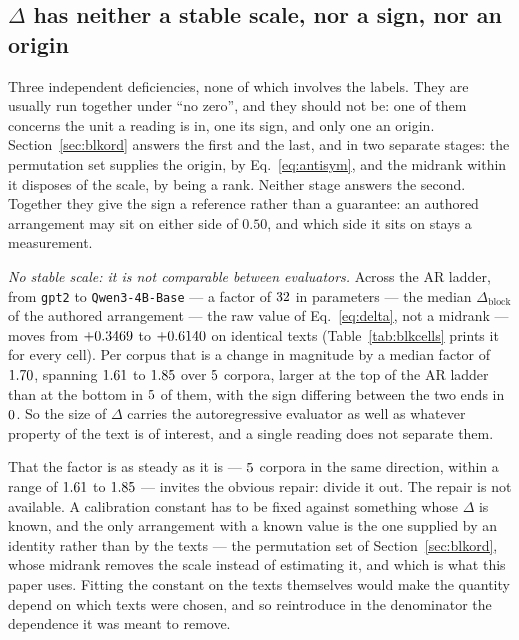 \documentclass[11pt]{article}
\newcommand{\Dblock}{\Delta_{\mathrm{block}}}
\begin{document}
\subsection{$\Delta$ has neither a stable scale, nor a sign, nor an origin}
\label{sec:capacity}
Three independent deficiencies, none of which involves the labels.  They are
usually run together under ``no zero'', and they should not be: one of them
concerns the unit a reading is in, one its sign, and only one an origin.  Section~\ref{sec:blkord} answers the first and the last, and in two separate stages: the permutation set supplies the origin, by
Eq.~\eqref{eq:antisym}, and the midrank within it disposes of the scale, by
being a rank.  Neither stage answers the second.  Together they give the sign
a reference rather than a guarantee: an authored arrangement may sit on
either side of $0.50$, and which side it sits on stays a measurement.

\emph{No stable scale: it is not comparable between evaluators.}  Across the
AR ladder, from \texttt{gpt2} to \texttt{Qwen3-4B-Base} --- a factor of
$32$ in parameters --- the median $\Dblock$ of the authored
arrangement --- the raw value of Eq.~\eqref{eq:delta}, not a midrank ---
moves from $+0.3469$ to $+0.6140$ on identical texts
(Table~\ref{tab:blkcells} prints it for every cell).
Per corpus that is a change in magnitude by a median factor of
$1.70$, spanning $1.61$ to $1.85$ over
$5$ corpora, larger at the top of the AR ladder than at the
bottom in $5$ of them,
with the sign differing between the two ends in $0$.  So the size of $\Delta$ carries the autoregressive evaluator as well as
whatever property of the text is of interest, and a single reading does not
separate them.

That the factor is as steady as it is --- $5$ corpora in the same
direction, within a range of $1.61$ to $1.85$ --- invites the
obvious repair: divide it out.  The repair is not available.  A calibration
constant has to be fixed against something whose $\Delta$ is known, and the
only arrangement with a known value is the one supplied by an
identity rather than by the texts --- the permutation set of
Section~\ref{sec:blkord}, whose midrank removes the scale instead of
estimating it, and which is what this paper uses.  Fitting the constant on the texts
themselves would make the quantity depend on which texts were chosen, and so
reintroduce in the denominator the dependence it was meant to remove.
\end{document}
